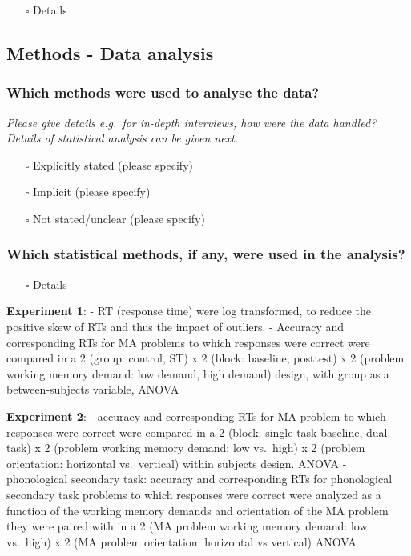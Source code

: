 \documentclass[
  doc, a4paper]{apa7}
\providecommand{\tightlist}{%
  \setlength{\itemsep}{0pt}\setlength{\parskip}{0pt}}
\begin{document}
\begin{itemize}
\tightlist
\item[$\square$]
  Details
\end{itemize}

\subsection{Methods - Data analysis}\label{methods---data-analysis}

\subsubsection{Which methods were used to analyse the data?}\label{which-methods-were-used-to-analyse-the-data}

\emph{Please give details e.g.~for in-depth interviews, how were the data handled? Details of statistical analysis can be given next.}

\begin{itemize}
\tightlist
\item[$\square$]
  Explicitly stated (please specify)
\item[$\square$]
  Implicit (please specify)
\item[$\square$]
  Not stated/unclear (please specify)
\end{itemize}

\subsubsection{Which statistical methods, if any, were used in the analysis?}\label{which-statistical-methods-if-any-were-used-in-the-analysis}

\begin{itemize}
\tightlist
\item[$\square$]
  Details
\end{itemize}

\textbf{Experiment 1}:
- RT (response time) were log transformed, to reduce the positive skew of RTs and thus the impact of outliers.
- Accuracy and corresponding RTs for MA problems to which responses were correct were compared in a 2 (group: control, ST) x 2 (block: baseline, posttest) x 2 (problem working memory demand: low demand, high demand) design, with group as a between-subjects variable, ANOVA

\textbf{Experiment 2}:
- accuracy and corresponding RTs for MA problem to which responses were correct were compared in a 2 (block: single-task baseline, dual-task) x 2 (problem working memory demand: low vs.~high) x 2 (problem orientation: horizontal vs.~vertical) within subjects design. ANOVA
- phonological secondary task: accuracy and corresponding RTs for phonological secondary task problems to which responses were correct were analyzed as a function of the working memory demands and orientation of the MA problem they were paired with in a 2 (MA problem working memory demand: low vs.~high) x 2 (MA problem orientation: horizontal vs vertical) ANOVA
\end{document}

